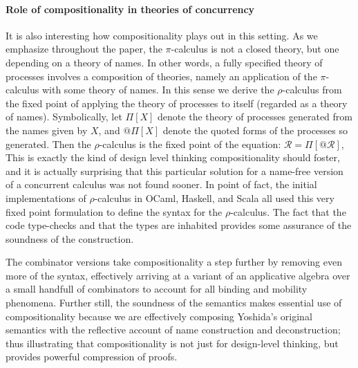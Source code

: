 \documentclass[submission,copyright,creativecommons]{eptcs}
\makeatletter
\newcommand{\pic}{$\pi$-calculus}
\newcommand{\quotep}[1]{\mathsf{@}#1}
\newcommand{\rhoc}{$\rho$-calculus}
\theoremstyle{definition}
\theoremstyle{remark}
\theoremstyle{remark}
\makeatother
\begin{document}
\paragraph*{Role of compositionality in theories of concurrency} 
It is also interesting how compositionality plays out in this
setting. As we emphasize throughout the paper, the {\pic\;} is not a
closed theory, but one depending on a theory of names. In other words,
a fully specified theory of processes involves a composition of
theories, namely an application of the {\pic\;} with some theory of
names. In this sense we derive the {\rhoc}
\cite{DBLP:journals/entcs/MeredithR05} from the fixed point of
applying the theory of processes to itself (regarded as a theory of
names). Symbolically, let $\Pi[X]$ denote the theory of processes
generated from the names given by $X$, and $\quotep{\Pi[X]}$ denote
the quoted forms of the processes so generated. Then the {\rhoc} is
the fixed point of the equation: 
  $\mathcal{R} = \Pi[\quotep{\mathcal{R}}]$, 
This is exactly the kind of design level thinking compositionality
should foster, and it is actually surprising that this particular
solution for a name-free version of a concurrent calculus was not
found sooner. In point of fact, the initial implementations of {\rhoc}
in OCaml, Haskell, and Scala all used this very fixed point
formulation to define the syntax for the {\rhoc}. The fact that the
code type-checks and that the types are inhabited provides some
assurance of the soundness of the construction.

The combinator versions take compositionality a step further by
removing even more of the syntax, effectively arriving at a variant of
an applicative algebra over a small handfull of combinators to account
for all binding and mobility phenomena. Further still, the soundness
of the semantics makes essential use of compositionality because we
are effectively composing Yoshida's original semantics with the
reflective account of name construction and deconstruction; thus
illustrating that compositionality is not just for design-level
thinking, but provides powerful compression of proofs.
\end{document}
